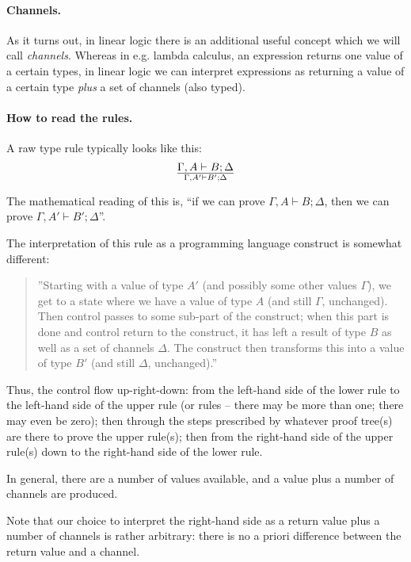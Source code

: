 \documentclass[a4paper]{article}
\begin{document}
\paragraph{Channels.} As it turns out, in linear logic there is an additional useful concept
which we will call \emph{channels}.
Whereas in e.g. lambda calculus, an expression returns one value of a
certain types, in linear logic we can interpret expressions as
returning a value of a certain type \emph{plus} a set of channels
(also typed).


\paragraph{How to read the rules.} A raw type rule typically looks like this:
$$
{\Gamma,A \vdash B;\Delta}\over{\Gamma,A' \vdash B';\Delta}
$$

The mathematical reading of this is, ``if we can prove ${\Gamma,A
  \vdash B;\Delta}$, then we can prove ${\Gamma,A' \vdash B';\Delta}$''.


The interpretation of this rule as a programming language construct is
somewhat different:
\begin{quote}
  ''Starting with a value of type $A'$ (and possibly some other values
  $\Gamma$), we get to a state where we have a value of type $A$ (and
  still $\Gamma$, unchanged). Then control passes to some sub-part of
  the construct; when this part is done and control return to the construct,
  it has left a result of type $B$ as well as a set of channels
  $\Delta$. The construct then transforms this into a value of type
  $B'$ (and still $\Delta$, unchanged).''
\end{quote}

Thus, the control flow up-right-down:
from the left-hand side of the lower rule to
the left-hand side of the upper rule (or rules -- there may be more
than one; there may even be zero); then through the steps prescribed
by whatever proof tree(s) are there to prove the upper rule(s); then
from the right-hand side of the upper rule(s) down to the right-hand
side of the lower rule.

In general, there are a number of values available, and a value plus a
number of channels are produced.

Note that our choice to interpret the right-hand side as a return
value plus a number of channels is rather arbitrary: there is no a
priori difference between the return value and a channel.
\end{document}
